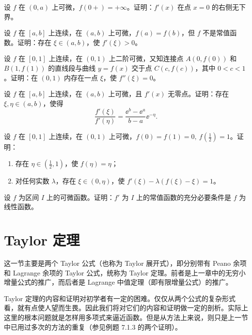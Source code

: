\begin{xexercise}[15]
设 $f$ 在 $(0,a)$ 上可微，$f(0+)=+\infty$。证明：$f'(x)$ 在点 $x=0$ 的右侧无下界。
\end{xexercise}

\begin{xexercise}[16]
设 $f$ 在 $[a,b]$ 上连续，在 $(a,b)$ 上可微，$f(a)=f(b)$，但 $f$ 不是常值函数。证明：存在 $\xi\in(a,b)$，使 $f'(\xi)>0$。
\end{xexercise}

\begin{xexercise}[17]
设 $f$ 在 $[0,1]$ 上连续，在 $(0,1)$ 上二阶可微，又知连接点 $A(0,f(0))$ 和 $B(1,f(1))$ 的直线段与曲线 $y=f(x)$ 交于点 $C(c,f(c))$，其中 $0<c<1$。证明：在 $(0,1)$ 内存在一点 $\xi$，使 $f''(\xi)=0$。
\end{xexercise}

\begin{xexercise}[18]
设 $f$ 在 $[a,b]$ 上连续，在 $(a,b)$ 上可微，且 $f'(x)$ 无零点。证明：存在 $\xi,\eta\in(a,b)$，使得
\[
  \frac{f'(\xi)}{f'(\eta)}=\frac{\ee^b-\ee^a}{b-a}\ee^{-\eta}.
\]
\end{xexercise}

\begin{xexercise}[19]
设 $f$ 在 $[0,1]$ 上连续，在 $(0,1)$ 上可微，$f(0)=f(1)=0,\ f\left(\frac12\right)=1$。证明：
\begin{enumerate}[label=(\arabic*)]
  \item 存在 $\eta\in\left(\frac12,1\right)$，使 $f(\eta)=\eta$；
  \item 对任何实数 $\lambda$，存在 $\xi\in(0,\eta)$，使 $f'(\xi)-\lambda(f(\xi)-\xi)=1$。
\end{enumerate}
\end{xexercise}

\begin{xexercise}[20]
设 $f$ 为区间 $I$ 上的可微函数。证明：$f'$ 为 $I$ 上的常值函数的充分必要条件是 $f$ 为线性函数。
\end{xexercise}

\section{Taylor 定理}

这一节主要是两个 Taylor 公式（也称为 Taylor 展开式），即分别带有 Peano 余项和 Lagrange 余项的 Taylor 公式，统称为 Taylor 定理。前者是上一章中的无穷小增量公式的推广，而后者是 Lagrange 中值定理（即有限增量公式）的推广。

Taylor 定理的内容和证明对初学者有一定的困难。仅仅从两个公式的复杂形式看，就有点使人望而生畏。因此我们将对它们的内容和证明做一定的剖析。实际上这里的根本问题就是怎样用多项式来逼近函数。但是从方法上来说，则只是上一节中已用过多次的方法的重复（参见例题 7.1.3 的两个证明）。

